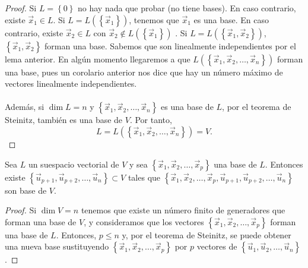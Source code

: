 \begin{proof}
Si $\displaystyle L = \left\{ 0\right\}  $ no hay nada que probar (no tiene bases). En caso contrario, existe $\displaystyle \vec{x}_{1} \in L $. Si $\displaystyle L = L\left( \left\{ \vec{x}_{1}\right\} \right) $, tenemos que $\displaystyle \vec{x}_{1} $ es una base. En caso contrario, existe $\displaystyle \vec{x}_{2} \in L $ con $\displaystyle \vec{x}_{2} \not\in L \left( \left\{ \vec{x}_{1}\right\} \right) $ . Si $\displaystyle L = L\left( \left\{ \vec{x}_{1}, \vec{x}_{2}\right\} \right) $, $\displaystyle \left\{ \vec{x}_{1}, \vec{x}_{2}\right\}  $ forman una base. Sabemos que son linealmente independientes por el lema anterior. En algún momento llegaremos a que $\displaystyle L\left( \left\{ \vec{x}_{1}, \vec{x}_{2}, \ldots, \vec{x}_{n}\right\} \right) $ forman una base, pues un corolario anterior nos dice que hay un número máximo de vectores linealmente independientes. \\ \\
Además, si $\displaystyle \dim L = n $ y $\displaystyle \left\{ \vec{x}_{1}, \vec{x}_{2}, \ldots, \vec{x}_{n}\right\}  $ es una base de $\displaystyle L $, por el teorema de Steinitz, también es una base de $\displaystyle V $. Por tanto, 
\[ L = L\left( \left\{ \vec{x}_{1}, \vec{x}_{2}, \ldots, \vec{x}_{n}\right\} \right) = V .\]
\end{proof}

\begin{ftheorem}
\normalfont Sea $\displaystyle L $ un suespacio vectorial de $\displaystyle V $ y sea $\displaystyle \left\{ \vec{x}_{1}, \vec{x}_{2}, \ldots, \vec{x}_{p}\right\}  $ una base de $\displaystyle L $. Entonces existe $\displaystyle \left\{ \vec{u}_{p+1}, \vec{u}_{p+2}, \ldots, \vec{u}_{n}\right\} \subset V $ tales que $\displaystyle \left\{ \vec{x}_{1}, \vec{x}_{2}, \ldots, \vec{x}_{p}, \vec{u}_{p+1}, \vec{u}_{p+2}, \ldots, \vec{u}_{n}\right\}  $ son base de $\displaystyle V $.
\end{ftheorem}

\begin{proof}
Si $\displaystyle \dim V = n $ tenemos que existe un número finito de generadores que forman una base de $\displaystyle V $, y consideramos que los vectores $\displaystyle \left\{ \vec{x}_{1}, \vec{x}_{2}, \ldots, \vec{x}_{p}\right\}  $ forman una base de $\displaystyle L $. Entonces, $\displaystyle p \leq n $ y, por el teorema de Steinitz, se puede obtener una nueva base sustituyendo $\displaystyle \left\{ \vec{x}_{1}, \vec{x}_{2}, \ldots, \vec{x}_{p}\right\}  $ por $\displaystyle p $ vectores de $\displaystyle \left\{ \vec{u}_{1}, \vec{u}_{2}, \ldots, \vec{u}_{n}\right\}  $.
\end{proof}

